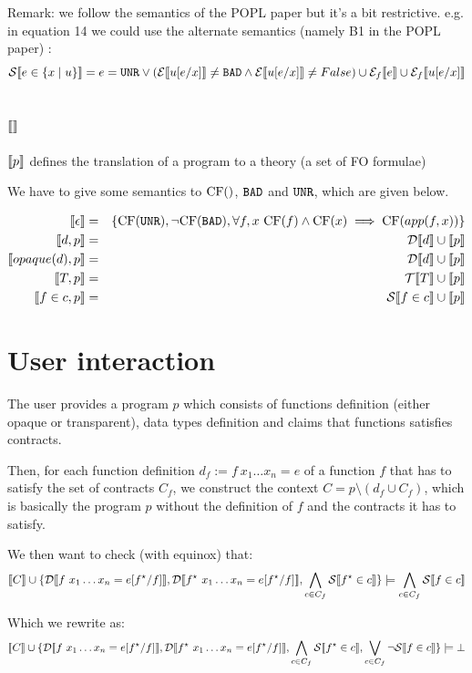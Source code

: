 \documentclass{article}
\begin{document}
Remark: we follow the semantics of the POPL paper but it's a bit restrictive.
e.g. in equation 14 we could use the alternate semantics (namely B1 in the POPL paper) : 
$$\mathcal{S} \llbracket e \in \{x \mid u \} \rrbracket = e = \texttt{UNR} \lor (\mathcal{E} \llbracket u[e/x] \rrbracket \neq \texttt{BAD} \land \mathcal{E} \llbracket u[e/x] \rrbracket \neq False) \cup \mathcal{E}_{f} \llbracket e \rrbracket \cup \mathcal{E}_{f} \llbracket u[e/x] \rrbracket$$

\subsection{$\llbracket  \rrbracket$}
$\llbracket p \rrbracket$ defines the translation of a program to a theory (a set of FO formulae)

We have to give some semantics to $\mbox{CF}()$, $\texttt{BAD}$ and $\texttt{UNR}$, which are given below.

\begin{eqnarray}
\llbracket \epsilon \rrbracket &=& \{ \mbox{CF}(\texttt{UNR}), \lnot \mbox{CF}(\texttt{BAD}), \forall f,x~\mbox{CF}(f) \land \mbox{CF}(x) \implies \mbox{CF}(app(f,x)) \}\\
\llbracket d,p \rrbracket &=& \mathcal{D} \llbracket d \rrbracket \cup \llbracket p \rrbracket\\
\llbracket opaque(d),p \rrbracket &=& \mathcal{D} \llbracket d \rrbracket \cup \llbracket p \rrbracket\\
\llbracket T,p \rrbracket &=& \mathcal{T} \llbracket T \rrbracket \cup \llbracket p \rrbracket\\
\llbracket f \in c,p \rrbracket &=& \mathcal{S} \llbracket f \in c \rrbracket \cup \llbracket p \rrbracket\\
\end{eqnarray}

\section{User interaction}

The user provides a program $p$ which consists of functions definition (either opaque or transparent), data types definition and claims that functions satisfies contracts.

Then, for each function definition $d_f := f~x_1 \dots x_n = e$ of a function $f$ that has to satisfy the set of contracts $C_f$, we construct the context $C = p \setminus ( d_f \cup C_f )$, which is basically the program $p$ without the definition of $f$ and the contracts it has to satisfy. 

We then want to check (with equinox) that:
 $$\llbracket C \rrbracket \cup \{ \mathcal{D} \llbracket f~x_1 \dots x_n = e[f^\star/f] \rrbracket, \mathcal{D} \llbracket f^\star~x_1 \dots x_n = e[f^\star/f] \rrbracket, \bigwedge_{c \in C_f} \mathcal{S} \llbracket f^\star \in c \rrbracket \} \models \bigwedge_{c \in C_f} \mathcal{S} \llbracket f \in c \rrbracket$$

Which we rewrite as:
 $$\llbracket C \rrbracket \cup \{ \mathcal{D} \llbracket f~x_1 \dots x_n = e[f^\star/f] \rrbracket, \mathcal{D} \llbracket f^\star~x_1 \dots x_n = e[f^\star/f] \rrbracket, \bigwedge_{c \in C_f} \mathcal{S} \llbracket f^\star \in c \rrbracket,  \bigvee_{c \in C_f} \lnot \mathcal{S} \llbracket f \in c \rrbracket \} \models \bot$$
\end{document}
